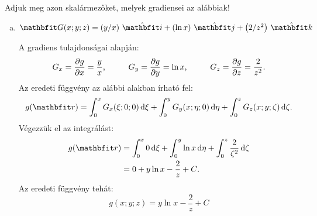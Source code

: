\documentclass[lang=magyar]{math-handout}
\begin{document}
\begin{exercise}{Adjuk meg azon skalármezőket, melyek gradiensei az alábbiak!}
{\begin{enumerate}[a)]
      \item $\rvec G(x;y;z) = \ijk{y/x}{\ln x}{2/z^{2}}$

            \vspace{3mm}
            A gradiens tulajdonságai alapján:
            \[
              G_x = \pdv{g}{x} = \frac{y}{x}
              \text,\hspace{1cm}
              G_y = \pdv{g}{y} = \ln x
              \text,\hspace{1cm}
              G_z = \pdv{g}{z} = \frac{2}{z^2}
              \text.
            \]
            Az eredeti függvény az alábbi alakban írható fel:
            \[
              g(\rvec r) =
              \int_0^x G_x(\xi; 0; 0) \,\diff \xi +
              \int_0^y G_y(x; \eta; 0) \,\diff \eta +
              \int_0^z G_z(x; y; \zeta) \,\diff \zeta
              \text.
            \]
            Végezzük el az integrálást:
            \begin{align*}
              g(\rvec r)
               & =
              \int_0^x 0 \,\diff \xi +
              \int_0^y \ln x \,\diff \eta +
              \int_0^z \frac{2}{\zeta^2} \,\diff \zeta
              \\
               & =
              0 + y \ln x - \frac{2}{z} + C
              \text.
            \end{align*}
            Az eredeti függvény tehát:
            \[
              g(x;y;z) = y \ln x - \frac{2}{z} + C
            \]
    \end{enumerate}
  }
\end{exercise}
\end{document}
